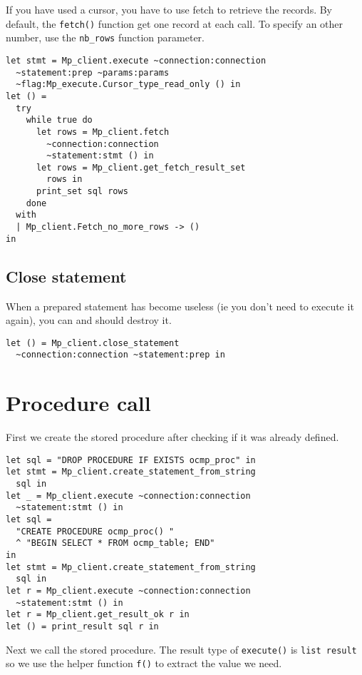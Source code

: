 \documentclass[a4paper, english, 11pt]{article}
\begin{document}
If you have used a cursor, you have to use fetch to retrieve the records. By default, the \texttt{fetch()} function get one record at each call. To specify an other number, use the \texttt{nb\_rows} function parameter.

\begin{verbatim}
let stmt = Mp_client.execute ~connection:connection 
  ~statement:prep ~params:params 
  ~flag:Mp_execute.Cursor_type_read_only () in
let () = 
  try
    while true do
      let rows = Mp_client.fetch
        ~connection:connection 
        ~statement:stmt () in
      let rows = Mp_client.get_fetch_result_set
        rows in
      print_set sql rows
    done
  with
  | Mp_client.Fetch_no_more_rows -> ()
in
\end{verbatim}

\subsection{Close statement}

When a prepared statement has become useless (ie you don't need to execute it again), you can and should destroy it.

\begin{verbatim}
let () = Mp_client.close_statement 
  ~connection:connection ~statement:prep in
\end{verbatim}

\section{Procedure call}

First we create the stored procedure after checking if it was already defined.

\begin{verbatim}
let sql = "DROP PROCEDURE IF EXISTS ocmp_proc" in
let stmt = Mp_client.create_statement_from_string 
  sql in
let _ = Mp_client.execute ~connection:connection 
  ~statement:stmt () in 
let sql = 
  "CREATE PROCEDURE ocmp_proc() "
  ^ "BEGIN SELECT * FROM ocmp_table; END"
in
let stmt = Mp_client.create_statement_from_string 
  sql in
let r = Mp_client.execute ~connection:connection 
  ~statement:stmt () in 
let r = Mp_client.get_result_ok r in
let () = print_result sql r in
\end{verbatim}

Next we call the stored procedure. The result type of \texttt{execute()} is \texttt{list result} so we use the helper function \texttt{f()} to extract the value we need.
\end{document}
